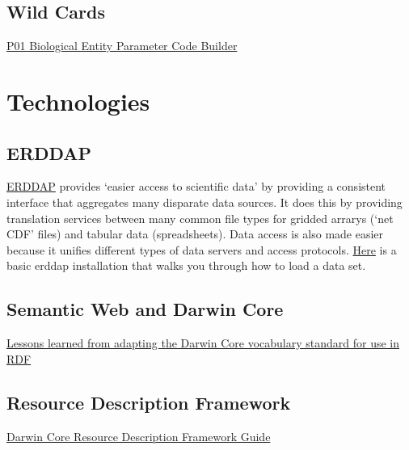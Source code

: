 \documentclass[]{book}
\begin{document}
\hypertarget{wild-cards}{%
\subsection{Wild Cards}\label{wild-cards}}

\href{\%22https://www.bodc.ac.uk/resources/vocabularies/vocabulary_builder/biomodel/\%22}{P01 Biological Entity Parameter Code Builder}

\hypertarget{technologies}{%
\section{Technologies}\label{technologies}}

\hypertarget{erddap}{%
\subsection{ERDDAP}\label{erddap}}

\href{\%22https://coastwatch.pfeg.noaa.gov/erddap/index.html\%22}{ERDDAP} provides `easier access to scientific data' by providing a consistent interface that aggregates many disparate data sources. It does this by providing translation services between many common file types for gridded arrarys (`net CDF' files) and tabular data (spreadsheets). Data access is also made easier because it unifies different types of data servers and access protocols. \href{\%22https://github.com/HakaiInstitute/erddap-basic\%22}{Here} is a basic erddap installation that walks you through how to load a data set.

\hypertarget{semantic-web-and-darwin-core}{%
\subsection{Semantic Web and Darwin Core}\label{semantic-web-and-darwin-core}}

\href{\%22http://www.semantic-web-journal.net/system/files/swj1093.pdf\%22}{Lessons learned from adapting the Darwin Core vocabulary standard for use in RDF}

\hypertarget{resource-description-framework}{%
\subsection{Resource Description Framework}\label{resource-description-framework}}

\href{\%22https://dwc.tdwg.org/rdf/\%22}{Darwin Core Resource Description Framework Guide}
\end{document}
